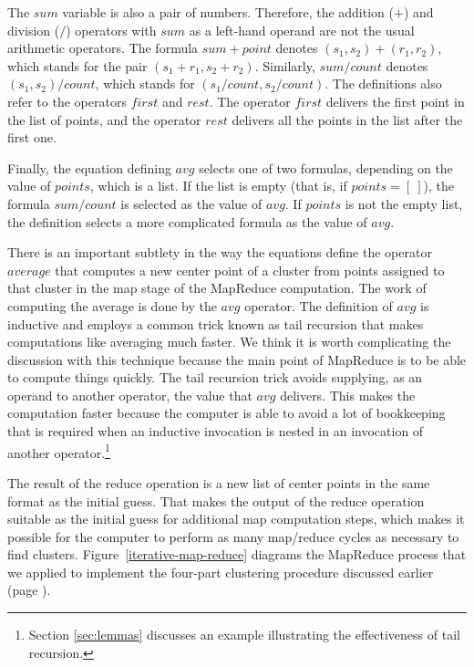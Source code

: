 The $sum$ variable is also a pair of numbers.
Therefore, the addition ($+$) and division ($/$) operators
with $sum$ as a left-hand operand are not the usual arithmetic operators.
The formula $sum + point$ denotes $(s_1, s_2) + (r_1,r_2)$,
which stands for the pair $(s_1+r_1, s_2+r_2)$.
Similarly, $sum/count$ denotes $(s_1,s_2)/count$,
which stands for $(s_1/count, s_2/count)$.
The definitions also refer to the operators $first$ and $rest$.
The operator $first$ delivers the first point in the list of points,
and the operator $rest$ delivers all the points in the list
after the first one.

Finally, the equation defining $avg$ selects one of two formulas,
depending on the value of $points$, which is a list.
If the list is empty (that is, if $points = [~]$),
the formula $sum/count$ is selected as the value of $avg$.
If $points$ is not the empty list, the definition selects
a more complicated formula as the value of $avg$.

There is an important subtlety in the way the equations define
the operator $average$ that computes a new center point of a cluster
from points assigned to that cluster in the map stage of the
MapReduce computation.
The work of computing the average is done by the $avg$ operator.
The definition of $avg$ is inductive and
employs a common trick known as tail recursion
that makes computations like averaging much faster.
We think it is worth complicating the discussion
with this technique because the main point
of MapReduce is to be able to compute things quickly.
The tail recursion
trick avoids supplying, as an operand to another operator,
the value that $avg$ delivers.
This makes the computation
faster because the computer is able to avoid a lot of bookkeeping 
that is required when an inductive
invocation is nested in an invocation of another 
operator.\footnote{Section \ref{sec:lemmas} discusses an
example illustrating the effectiveness of tail recursion.}

The result of the reduce operation is a new list of center points
in the same format as the initial guess.
That makes the output of the
reduce operation suitable as
the initial guess for additional map computation steps,
which makes it possible for the computer to perform as many
map/reduce cycles as necessary to find clusters.
Figure~\ref{iterative-map-reduce} diagrams the MapReduce
process that we applied to implement the four-part clustering procedure
discussed earlier (page \pageref{cluster-process}).

